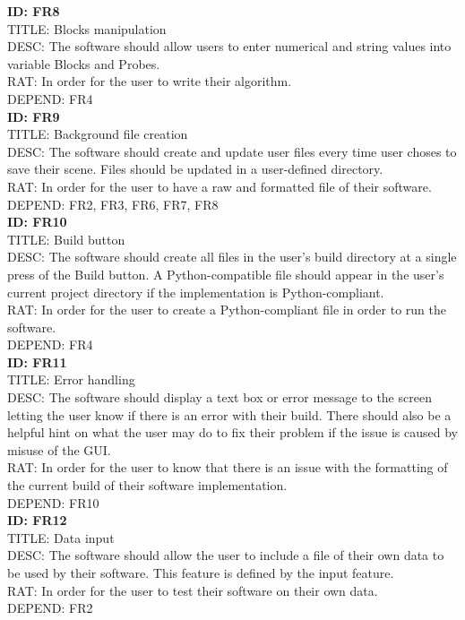 \documentclass[journal,10pt,onecolumn,compsoc]{IEEEtran} \usepackage[margin=1.0in]{geometry} \usepackage{pdfpages} \usepackage{graphicx}
\begin{document}
\noindent
\textbf{ID: FR8}\\
TITLE: Blocks manipulation\\
DESC: The software should allow users to enter numerical and string values into variable Blocks and Probes.\\
RAT: In order for the user to write their algorithm.\\
DEPEND: FR4\\

\noindent
\textbf{ID: FR9}\\
TITLE: Background file creation\\
DESC: The software should create and update user files every time user choses to save their scene. 
Files should be updated in a user-defined directory.\\
RAT: In order for the user to have a raw and formatted file of their software.\\
DEPEND: FR2, FR3, FR6, FR7, FR8\\

\noindent
\textbf{ID: FR10}\\
TITLE: Build button\\
DESC: The software should create all files in the user's build directory at a single press of the Build button. 
A Python-compatible file should appear in the user's current project directory if the implementation is Python-compliant.\\
RAT: In order for the user to create a Python-compliant file in order to run the software.\\
DEPEND: FR4\\

\noindent
\textbf{ID: FR11}\\
TITLE: Error handling\\
DESC: The software should display a text box or error message to the screen letting the user know if there is an error with their build. 
There should also be a helpful hint on what the user may do to fix their problem if the issue is caused by misuse of the GUI.\\
RAT: In order for the user to know that there is an issue with the formatting of the current build of their software implementation.\\
DEPEND: FR10\\

\noindent
\textbf{ID: FR12}\\
TITLE: Data input\\
DESC: The software should allow the user to include a file of their own data to be used by their software.
This feature is defined by the input feature.\\
RAT: In order for the user to test their software on their own data.\\
DEPEND: FR2\\
\end{document}
